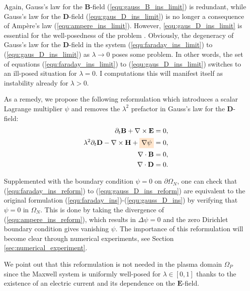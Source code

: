 \documentclass{article}
\begin{document}
Again, Gauss's law for the $\mathbf{B}$-field (\ref{equ:gauss_B_ins_limit}) is redundant,
while Gauss's law for the $\mathbf{D}$-field (\ref{equ:gaus_D_ins_limit}) is no longer a
consequence of Amp\`{e}re's law (\ref{equ:ampere_ins_limit}). However,
\eqref{equ:gaus_D_ins_limit} is essential for the well-posedness of the problem \cite[][p.
7]{ana_2010}. Obviously, the degeneracy of Gauss's law for the $\mathbf{D}$-field in the
system (\ref{equ:faraday_ins_limit}) to (\ref{equ:gaus_D_ins_limit}) as
$\lambda \rightarrow 0$ poses some problem. In other words, the set of equations
(\ref{equ:faraday_ins_limit}) to (\ref{equ:gaus_D_ins_limit}) switches to an ill-posed
situation for $\lambda=0$. I computations this will manifest itself as instability 
already for ${\lambda>0}$.

As a remedy, we propose the following reformulation which introduces a scalar Lagrange
multiplier $\psi$ and removes the $\lambda^2$ prefactor in Gauss's law for the
$\mathbf{D}$-field:
\begin{subequations}
\begin{align}
    \partial_t \mathbf{B} + \nabla \times \mathbf{E} &= 0, \label{equ:faraday_ins_reform}\\ 
    \lambda^2 \partial_t \mathbf{D} - \nabla \times \mathbf{H} + \colorbox{orange!20}{$\nabla \psi$} &= 0,  \label{equ:ampere_ins_reform}\\
    \nabla \cdot \mathbf{B} &= 0, \label{equ:gauss_B_ins_reform}\\
    \nabla \cdot \mathbf{D} &= 0 \label{equ:gauss_D_ins_reform}.
\end{align}
\end{subequations}

Supplemented with the boundary condition $\psi = 0$ on $\partial\Omega_N$, one can check
that (\ref{equ:faraday_ins_reform}) to (\ref{equ:gauss_D_ins_reform}) are equivalent to
the original formulation (\ref{equ:faraday_ins})-(\ref{equ:gauss_D_ins}) by verifying that
$\psi = 0$ in $\Omega_N$. This is done by taking the divergence of
(\ref{equ:ampere_ins_reform}), which results in $\Delta\psi = 0$ and the zero Dirichlet
boundary condition gives vanishing $\psi$. The importance of this reformulation will
become clear through numerical experiments, see Section \ref{sec:numerical_experiment}.

We point out that this reformulation is not needed in the plasma domain $\Omega_P$ since
the Maxwell system is uniformly well-posed for $\lambda \in [0,1]$ thanks to the existence
of an electric current and its dependence on the $\mathbf{E}$-field.
\end{document}

